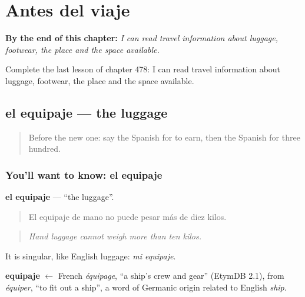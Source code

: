 
\chapter{Antes del viaje}
\label{ch:es-antes-del-viaje}

\begin{chapteropening}
\textbf{By the end of this chapter:} \emph{I can read travel information about luggage, footwear, the place and the space available.}

Complete the last lesson of chapter 478: I can read travel information about luggage, footwear, the place and the space available.
\end{chapteropening}

\section[el equipaje]{el equipaje — the luggage}

\label{lesson:ES-C478-equipaje}



\begin{quote}
Before the new one: say the Spanish for to earn, then the Spanish for three hundred.
\end{quote}

\subsection*{You'll want to know: el equipaje}
\textbf{el equipaje} — \textquotedblleft{}the luggage\textquotedblright{}.

\begin{quote}
El equipaje de mano no puede pesar más de diez kilos.
\end{quote}

\begin{quote}
\emph{Hand luggage cannot weigh more than ten kilos.}
\end{quote}

It is singular, like English luggage: \emph{mi equipaje}.

\begin{cousinweb}
\textbf{equipaje} $\leftarrow$ French \emph{équipage}, \textquotedblleft{}a ship's crew and gear\textquotedblright{} (EtymDB 2.1), from \emph{équiper}, \textquotedblleft{}to fit out a ship\textquotedblright{}, a word of Germanic origin related to English \emph{ship}.
\end{cousinweb}

